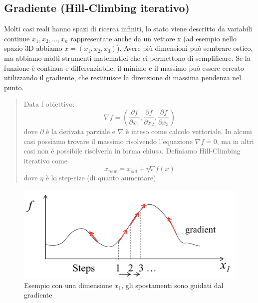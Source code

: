 \documentclass{article}
\begin{document}
\subsection{Gradiente (Hill-Climbing iterativo)}
Molti casi reali hanno spazi di ricerca infiniti, lo stato viene descritto da variabili continue $x_1, x_2, ..., x_n$ rappresentate anche da un vettore x (ad esempio nello spazio 3D abbiamo $x=(x_1,x_2,x_3)$). Avere più dimensioni può sembrare ostico, ma abbiamo molti strumenti matematici che ci permettono di semplificare. \newline
Se la funzione è continua e differenziabile, il minimo e il massimo può essere cercato utilizzando il gradiente, che restituisce la direnzione di massima pendenza nel punto.
\begin{quote}
    Data f obiettivo:
    \[
    \nabla f = (\frac{\partial f}{\partial x_1}, \frac{\partial f}{\partial x_2}, \frac{\partial f}{\partial x_3})
    \] \newline dove $\partial$ è la derivata parziale e $\nabla$ è inteso come calcolo vettoriale. In alcuni casi possiamo trovare il massimo risolvendo l'equazione $\nabla f=0$, ma in altri casi non é possibile risolverla in forma chiusa.\newline
    Definiamo Hill-Climbing iterativo come
    \[
        x_{new} = x_{old} + \eta \nabla f(x)
    \]
    dove $\eta$ è lo step-size (di quanto aumentare).
\end{quote}
\begin{figure}[H]
    \centering
    \includegraphics[scale=0.5]{Images/gradient.png}
    \caption{Esempio con una dimensione $x_1$, gli spostamenti sono guidati dal gradiente}
\end{figure}

\clearpage
\end{document}
